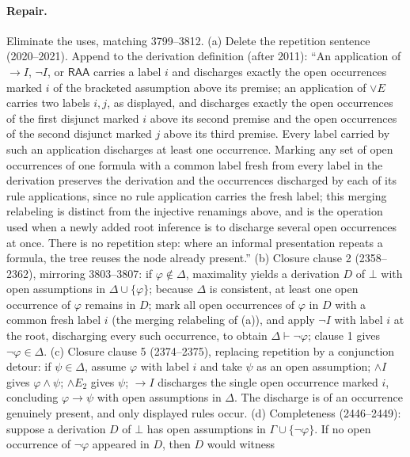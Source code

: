 \paragraph{Repair.} Eliminate the uses, matching 3799--3812.
(a) Delete the repetition sentence (2020--2021).  Append to the derivation
definition (after 2011): ``An application of \(\to I\), \(\neg I\), or
\(\mathsf{RAA}\) carries a label \(i\) and discharges exactly the open
occurrences marked \(i\) of the bracketed assumption above its premise; an
application of \(\lor E\) carries two labels \(i,j\), as displayed, and
discharges exactly the open occurrences of the first disjunct marked \(i\)
above its second premise and the open occurrences of the second disjunct
marked \(j\) above its third premise.  Every label carried by such an
application discharges at least one occurrence.  Marking any set of open
occurrences of one formula with a common label fresh from every label in
the derivation preserves the derivation and the occurrences discharged by
each of its rule applications, since no rule application carries the fresh
label; this merging relabeling is distinct from the injective renamings
above, and is the operation used when a newly added root inference is to
discharge several open occurrences at once.  There is no repetition step:
where an informal presentation repeats a formula, the tree reuses the node
already present.''
(b) Closure clause 2 (2358--2362), mirroring 3803--3807: if
\(\varphi\notin\Delta\), maximality yields a derivation \(D\) of \(\bot\)
with open assumptions in \(\Delta\cup\{\varphi\}\); because \(\Delta\) is
consistent, at least one open occurrence of \(\varphi\) remains in \(D\);
mark all open occurrences of \(\varphi\) in \(D\) with a common fresh label
\(i\) (the merging relabeling of (a)), and apply \(\neg I\) with label
\(i\) at the root, discharging every such occurrence, to obtain
\(\Delta\vdash\neg\varphi\); clause 1 gives \(\neg\varphi\in\Delta\).
(c) Closure clause 5 (2374--2375), replacing repetition by a conjunction
detour: if \(\psi\in\Delta\), assume \(\varphi\) with label \(i\) and take
\(\psi\) as an open assumption; \(\land I\) gives \(\varphi\land\psi\);
\(\land E_2\) gives \(\psi\); \(\to I\) discharges the single open
occurrence marked \(i\), concluding \(\varphi\to\psi\) with open
assumptions in \(\Delta\).  The discharge is of an occurrence genuinely
present, and only displayed rules occur.
(d) Completeness (2446--2449): suppose a derivation \(D\) of \(\bot\) has
open assumptions in \(\Gamma\cup\{\neg\varphi\}\).  If no open occurrence
of \(\neg\varphi\) appeared in \(D\), then \(D\) would witness
